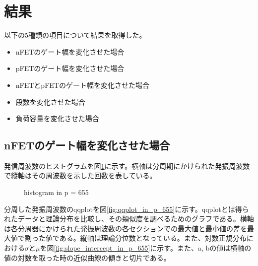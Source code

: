 \documentclass{jsarticle}
\begin{document}
\section{結果}
\label{sec:result}

以下の5種類の項目について結果を取得した。
\begin{itemize}
	\item
	nFETのゲート幅を変化させた場合
	\item
	pFETのゲート幅を変化させた場合
	\item
	nFETとpFETのゲート幅を変化させた場合
	\item
	段数を変化させた場合
	\item
	負荷容量を変化させた場合
\end{itemize}

\subsection{nFETのゲート幅を変化させた場合}
\label{sec:result_nFET}

発信周波数のヒストグラムを図\ref{fig:histogram_in_p_655}に示す。横軸は分周期にかけられた発振周波数で縦軸はその周波数を示した回数を表している。

\begin{figure}[hbtp]
	\centering
	\caption{histogram in p = 655}
	\label{fig:histogram_in_p_655}
\end{figure}

分周した発振周波数のqqplotを図\ref{fig:qqplot_in_p_655}に示す。qqplotとは得られたデータと理論分布を比較し、その類似度を調べるためのグラフである。横軸は各分周器にかけられた発振周波数の各セクションでの最大値と最小値の差を最大値で割った値である。縦軸は理論分位数となっている。また、対数正規分布における$\sigma$と$\mu$を図\ref{fig:slope_intercept_in_p_655}に示す。また、a, bの値は横軸の値の対数を取った時の近似曲線の傾きと切片である。
\end{document}
